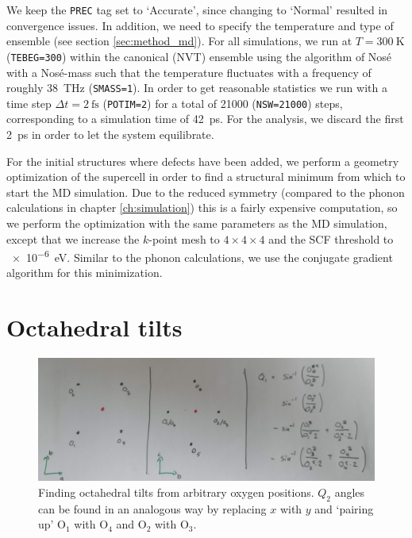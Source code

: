 We keep the \texttt{PREC} tag set to `Accurate', since changing to `Normal' resulted in convergence issues. In addition, we need to specify the temperature and type of ensemble (see section \ref{sec:method_md}). For all simulations, we run at $T=\SI{300}{\kelvin}$ (\texttt{TEBEG=300}) within the canonical (NVT) ensemble using the algorithm of Nos\'{e} with a Nos\'{e}-mass such that the temperature fluctuates with a frequency of roughly \SI{38}{\tera\hertz} (\texttt{SMASS=1}). In order to get reasonable statistics we run with a time step $\Delta t = \SI{2}{\femto\second}$ (\texttt{POTIM=2}) for a total of 21000 (\texttt{NSW=21000}) steps, corresponding to a simulation time of \SI{42}{\pico\second}. For the analysis, we discard the first \SI{2}{\pico\second} in order to let the system equilibrate.

For the initial structures where defects have been added, we perform a geometry optimization of the supercell in order to find a structural minimum from which to start the MD simulation. Due to the reduced symmetry (compared to the phonon calculations in chapter \ref{ch:simulation}) this is a fairly expensive computation, so we perform the optimization with the same parameters as the MD simulation, except that we increase the $k$-point mesh to $4 \times 4 \times 4$ and the SCF threshold to \SI{e-6}{\eV}. Similar to the phonon calculations, we use the conjugate gradient algorithm for this minimization.

\section{Octahedral tilts}\label{sec:md_tilts}
\begin{figure}
	\centering
	\includegraphics[width=\textwidth]{fig/md/octahedral_tilts_md.jpg}
	\caption[Finding octahedral tilts from arbitrary oxygen positions]{Finding octahedral tilts from arbitrary oxygen positions. $Q_2$ angles can be found in an analogous way by replacing $x$ with $y$ and `pairing up' O$_1$ with O$_4$ and O$_2$ with O$_3$.}
	\label{fig:md_octahedral_tilts}
\end{figure}

